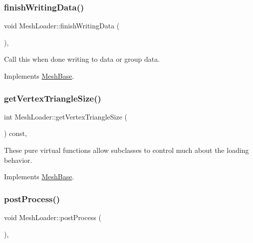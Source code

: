 \subsubsection{\texorpdfstring{finish\+Writing\+Data()}{finishWritingData()}}
{\footnotesize\ttfamily void Mesh\+Loader\+::finish\+Writing\+Data (\begin{DoxyParamCaption}{ }\end{DoxyParamCaption})\hspace{0.3cm}{\ttfamily [protected]}, {\ttfamily [virtual]}}

Call this when done writing to data or group data. 

Implements \hyperlink{class_mesh_base_a000796d7b04985f137d5a1368e90bcc6}{Mesh\+Base}.

\mbox{\label{class_mesh_loader_a3e228f5e2fbb1261cd76871ee07e4f58}} 
\subsubsection{\texorpdfstring{get\+Vertex\+Triangle\+Size()}{getVertexTriangleSize()}}
{\footnotesize\ttfamily int Mesh\+Loader\+::get\+Vertex\+Triangle\+Size (\begin{DoxyParamCaption}{ }\end{DoxyParamCaption}) const\hspace{0.3cm}{\ttfamily [inline]}, {\ttfamily [virtual]}}

These pure virtual functions allow subclasses to control much about the loading behavior. 

Implements \hyperlink{class_mesh_base_a508fde807d380849192391f28465fee4}{Mesh\+Base}.

\mbox{\label{class_mesh_loader_a83a3c78a6c2df1087c9f9e28c63e6d51}} 
\subsubsection{\texorpdfstring{post\+Process()}{postProcess()}}
{\footnotesize\ttfamily void Mesh\+Loader\+::post\+Process (\begin{DoxyParamCaption}{ }\end{DoxyParamCaption})\hspace{0.3cm}{\ttfamily [protected]}, {\ttfamily [virtual]}}


